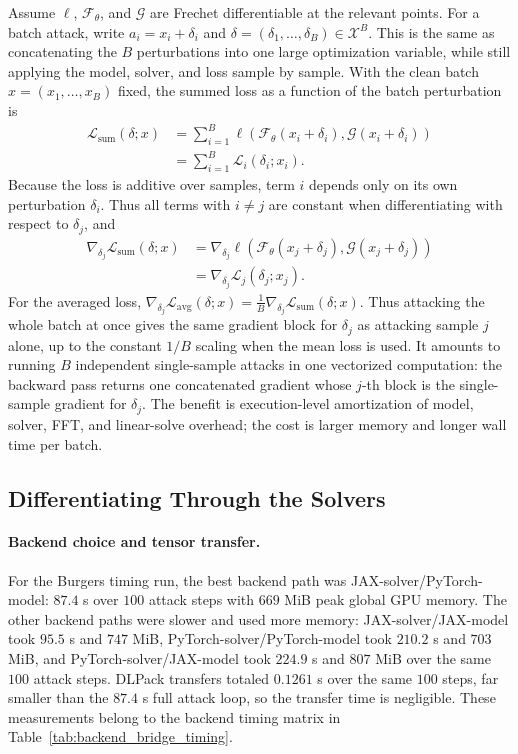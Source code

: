 \documentclass[letterpaper]{article} %
\newcommand{\tabref}[1]{Table~\ref{#1}}
\begin{document}
Assume $\ell$, $\mathcal{F}_\theta$, and $\mathcal{G}$ are Frechet
differentiable at the relevant points. For a batch attack, write
$a_i=x_i+\delta_i$ and
\(\delta=(\delta_1,\ldots,\delta_B)\in\mathcal X^B\). This is the same as
concatenating the \(B\) perturbations into one large optimization variable,
while still applying the model, solver, and loss sample by sample. With the
clean batch \(x=(x_1,\ldots,x_B)\) fixed, the summed loss as a function of the
batch perturbation is
\begin{align}
  \mathcal L_{\mathrm{sum}}(\delta;x)
  &=
  \sum_{i=1}^{B}
  \ell\!\left(
    \mathcal{F}_\theta(x_i+\delta_i),
    \mathcal{G}(x_i+\delta_i)
  \right)
  \nonumber\\
  &=
  \sum_{i=1}^{B}\mathcal L_i(\delta_i;x_i).
\end{align}
Because the loss is additive over samples, term \(i\) depends only on its own
perturbation \(\delta_i\). Thus all terms with \(i\ne j\) are constant when
differentiating with respect to \(\delta_j\), and
\begin{align}
  \nabla_{\delta_j}\mathcal L_{\mathrm{sum}}(\delta;x)
  &=
  \nabla_{\delta_j}
  \ell\!\left(
    \mathcal{F}_\theta(x_j+\delta_j),
    \mathcal{G}(x_j+\delta_j)
  \right)
  \nonumber\\
  &=
  \nabla_{\delta_j}\mathcal L_j(\delta_j;x_j).
\end{align}
For the averaged loss,
\(\nabla_{\delta_j}\mathcal L_{\mathrm{avg}}(\delta;x)
=\frac{1}{B}\nabla_{\delta_j}\mathcal L_{\mathrm{sum}}(\delta;x)\).
Thus attacking the whole batch at once gives the same gradient block for
\(\delta_j\) as attacking sample \(j\) alone, up to the constant $1/B$ scaling
when the mean loss is used. It amounts to running \(B\) independent
single-sample attacks in one vectorized computation: the backward pass returns
one concatenated gradient whose \(j\)-th block is the single-sample gradient for
\(\delta_j\). The benefit is execution-level amortization of model, solver, FFT,
and linear-solve overhead; the cost is larger memory and longer wall time per
batch.

\subsection*{Differentiating Through the Solvers}

\paragraph{Backend choice and tensor transfer.}
For the Burgers timing run, the best backend path was JAX-solver/PyTorch-model:
$87.4$ s over $100$ attack steps with $669$ MiB peak global GPU memory. The
other backend paths were slower and used more memory: JAX-solver/JAX-model took
$95.5$ s and $747$ MiB, PyTorch-solver/PyTorch-model took $210.2$ s and $703$
MiB, and PyTorch-solver/JAX-model took $224.9$ s and $807$ MiB over the same
$100$ attack steps. DLPack transfers totaled $0.1261$ s over the same $100$
steps, far smaller than the $87.4$ s full attack loop, so the transfer time is
negligible. These measurements belong to the backend timing matrix in
\tabref{tab:backend_bridge_timing}.
\end{document}
